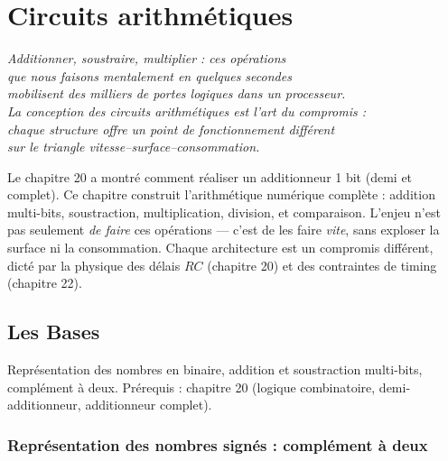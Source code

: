 \documentclass[12pt,a4paper,twoside]{book}
\begin{document}
\chapter{Circuits arithmétiques}

\begin{center}
\textit{Additionner, soustraire, multiplier : ces opérations\\
que nous faisons mentalement en quelques secondes\\
mobilisent des milliers de portes logiques dans un processeur.\\
La conception des circuits arithmétiques est l'art du compromis :\\
chaque structure offre un point de fonctionnement différent\\
sur le triangle vitesse--surface--consommation.}
\end{center}

\vspace{0.5cm}

Le chapitre 20 a montré comment réaliser un additionneur 1 bit (demi et complet). Ce chapitre construit l'arithmétique numérique complète : addition multi-bits, soustraction, multiplication, division, et comparaison. L'enjeu n'est pas seulement \textit{de faire} ces opérations --- c'est de les faire \textit{vite}, sans exploser la surface ni la consommation. Chaque architecture est un compromis différent, dicté par la physique des délais $RC$ (chapitre 20) et des contraintes de timing (chapitre 22).

\section{Les Bases}

\begin{bases}
Représentation des nombres en binaire, addition et soustraction multi-bits, complément à deux. Prérequis : chapitre 20 (logique combinatoire, demi-additionneur, additionneur complet).
\end{bases}

\subsection{Représentation des nombres signés : complément à deux}
\end{document}
